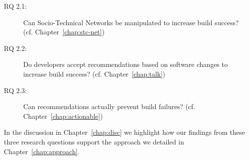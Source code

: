 \begin{description}
  \item[RQ 2.1:] Can Socio-Technical Networks be manipulated to increase build success? (cf. Chapter~\ref{chap:stc-net})
  \item[RQ 2.2:] Do developers accept recommendations based on software changes to increase build success? (cf. Chapter~\ref{chap:talk})
  \item[RQ 2.3:] Can recommendations actually prevent build failures? (cf. Chapter~\ref{chap:actionable})
\end{description}

In the discussion in Chapter~\ref{chap:disc} we highlight how our findings from these three research questions support the approach we detailed in Chapter~\ref{chap:approach}.









